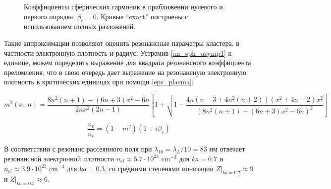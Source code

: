    \begin{figure}[htb]
        \hfil
		\caption{Коэффициенты сферических гармоник в приближении нулевого и первого порядка, $\beta_e = 0$. Кривые ``exact'' построены с использованием полных разложений.}\label{ab_asymp:image}
	\end{figure}


Такие аппроксимации позволяют оценить резонансные параметры кластера, в частности электронную плотность и радиус. Устремив \autoref{an_sph_asymp1} к единице, можем определить выражение для квадрата резонансного коэффициента преломления, что в свою очередь дает выражение на резонансную электронную плотность в критических единицах при помощи \autoref{eps_plasma}:

    \begin{equation}
        m^2 \left(x,\:n \right) = \frac{8n^2 (n + 1) - (6n + 3)x^2 - 6n}{2n x^2 (2n-1)} \left[ 1 + \sqrt{ 1 - \frac{4n (n-3 + 4n^2 (n + 2)) (x^2 + 4n-2) x^2}{{\left(8n^2 (n + 1) - (6n + 3)x^2 - 6n \right)}^{2}} } \right]
        \label{m2_resonance}
    \end{equation}

    \begin{equation}
        \frac{n_e}{n_c} = (1 - m^2) (1 + i \beta_e)
        \label{nenc_resonance}
    \end{equation}


В соответствии с  резонанс рассеянного поля при $\lambda_{10} = \lambda_{L} / 10 = 83$ нм отвечает резонансной электронной плотности $n_{el} \approx 5.7 \cdot 10^{23}$ $\textrm{cm}^{-3}$ для $ka = 0.7$ и $n_{el} \approx 3.9 \cdot 10^{23}$ $\textrm{cm}^{-3}$ для $ka = 0.3$, со средними степенями ионизации $Z|_{ka = 0.7} \approx 9$ и $Z|_{ka = 0.3} \approx 6$.


